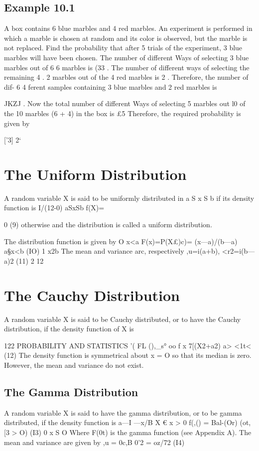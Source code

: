 \subsection{Example 10.1} 
A box contains 6 blue marbles and 4 red marbles. An experiment is performed in which a marble is chosen at random and its
color is observed, but the marble is not replaced. Find the probability that after 5 trials of the experiment, 3 blue marbles will have been chosen.
The number of different Ways of selecting 3 blue marbles out of 6
6
marbles is (33 . The number of different ways of selecting the remaining
4 .
2 marbles out of the 4 red marbles is 2 . Therefore, the number of dif-
6 4
ferent samples containing 3 blue marbles and 2 red marbles is {JKZJ .
Now the total number of different Ways of selecting 5 marbles out
l0
of the 10 marbles (6 + 4) in the box is £5  Therefore, the required
probability is given by


['3] 2‘
\section{The Uniform Distribution}
A random variable X is said to be uniformly distributed in a S x S b if
its density function is
I/(12-0) aSxSb
f(X)={ 0 (9)
otherwise
and the distribution is called a uniform distribution.

The distribution function is given by
O x<a
F(x)=P(X£)c)= (x—a)/(b—a) a§x<b (IO)
1 x2b
The mean and variance arc, respectively
,u=i(a+b), <r2=i(b—a)2 (11)
2 12
\section{The Cauchy Distribution}
A random variable X is said to be Cauchy distributed, or to have the
Cauchy distribution, if the density function of X is



122 PROBABILITY AND STATISTICS
'( FL (),_s° oo
f x 7[(X2+a2) a> <1t< (12)
The density function is symmetrical about x = O so that its median
is zero. However, the mean and variance do not exist.
\subsection{The Gamma Distribution}
A random variable X is said to have the gamma distribution, or to be
gamma distributed, if the density function is
a—I —x/B
X €
x > 0
f(,() = Bal-(Or) (ot,[3 > O) (I3)
0 x S O
Where F(0t) is the gamma function (see Appendix A). The mean and
variance are given by
,u = 0c,B 0'2 = oz/72 (I4)
}}
